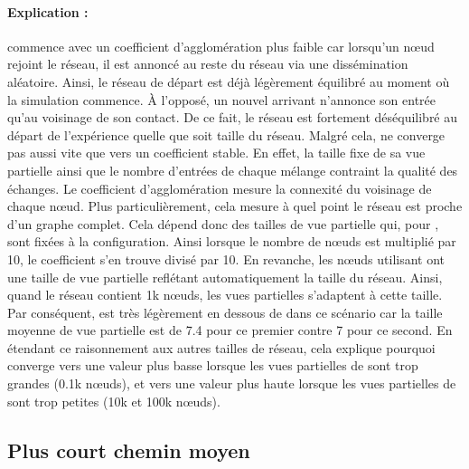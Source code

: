 \paragraph{Explication :} \CYCLON commence avec un coefficient d'agglomération
plus faible car lorsqu'un nœud rejoint le réseau, il est annoncé au reste du
réseau via une dissémination aléatoire. Ainsi, le réseau de départ est déjà
légèrement équilibré au moment où la simulation commence. À l'opposé, un nouvel
arrivant \SPRAY n'annonce son entrée qu'au voisinage de son contact. De ce fait,
le réseau est fortement déséquilibré au départ de l'expérience quelle que soit
taille du réseau. Malgré cela, \CYCLON ne converge pas aussi vite que \SPRAY
vers un coefficient stable. En effet, la taille fixe de sa vue partielle ainsi
que le nombre d'entrées de chaque mélange contraint la qualité des échanges.  Le
coefficient d'agglomération mesure la connexité du voisinage de chaque
nœud. Plus particulièrement, cela mesure à quel point le réseau est proche d'un
graphe complet. Cela dépend donc des tailles de vue partielle qui, pour \CYCLON,
sont fixées à la configuration.  Ainsi lorsque le nombre de nœuds est multiplié
par 10, le coefficient s'en trouve divisé par 10. En revanche, les nœuds
utilisant \SPRAY ont une taille de vue partielle reflétant automatiquement la
taille du réseau.  Ainsi, quand le réseau contient 1k nœuds, les vues partielles
s'adaptent à cette taille. Par conséquent, \SPRAY est très légèrement en dessous
de \CYCLON dans ce scénario car la taille moyenne de vue partielle est de 7.4
pour ce premier contre 7 pour ce second. En étendant ce raisonnement aux autres
tailles de réseau, cela explique pourquoi \SPRAY converge vers une valeur plus
basse lorsque les vues partielles de \CYCLON sont trop grandes (0.1k nœuds), et
vers une valeur plus haute lorsque les vues partielles de \CYCLON sont trop
petites (10k et 100k nœuds).

\subsection{Plus court chemin moyen}
\label{net:subsec:shortestpath}

